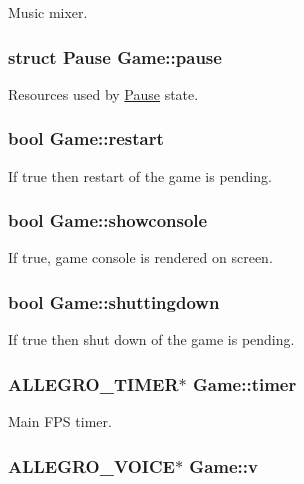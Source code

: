 Music mixer. \hypertarget{structGame_a3fe420d2d9b47cbdbb26d4f68bb5a0f0}{
\subsubsection[{pause}]{\setlength{\rightskip}{0pt plus 5cm}struct {\bf Pause} Game\-::pause}}\label{structGame_a3fe420d2d9b47cbdbb26d4f68bb5a0f0}
Resources used by \hyperlink{structPause}{Pause} state. \hypertarget{structGame_aad2035c807bd99529d1a07e443e0016b}{
\subsubsection[{restart}]{\setlength{\rightskip}{0pt plus 5cm}bool Game\-::restart}}\label{structGame_aad2035c807bd99529d1a07e443e0016b}
If true then restart of the game is pending. \hypertarget{structGame_ab1dafa4ce0c3526439418ac24bf616d8}{
\subsubsection[{showconsole}]{\setlength{\rightskip}{0pt plus 5cm}bool Game\-::showconsole}}\label{structGame_ab1dafa4ce0c3526439418ac24bf616d8}
If true, game console is rendered on screen. \hypertarget{structGame_a9a1d33be7ec00f87ede16b96bd2df312}{
\subsubsection[{shuttingdown}]{\setlength{\rightskip}{0pt plus 5cm}bool Game\-::shuttingdown}}\label{structGame_a9a1d33be7ec00f87ede16b96bd2df312}
If true then shut down of the game is pending. \hypertarget{structGame_a8d6d4f06c6412d085112cd007977d868}{
\subsubsection[{timer}]{\setlength{\rightskip}{0pt plus 5cm}A\-L\-L\-E\-G\-R\-O\-\_\-\-T\-I\-M\-E\-R$\ast$ Game\-::timer}}\label{structGame_a8d6d4f06c6412d085112cd007977d868}
Main F\-P\-S timer. \hypertarget{structGame_ab27cb95bcd1591fec45317a1e9f5062d}{
\subsubsection[{v}]{\setlength{\rightskip}{0pt plus 5cm}A\-L\-L\-E\-G\-R\-O\-\_\-\-V\-O\-I\-C\-E$\ast$ Game\-::v}}\label{structGame_ab27cb95bcd1591fec45317a1e9f5062d}
